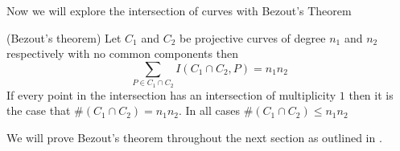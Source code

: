 Now we will explore the intersection of curves with Bezout's Theorem
\begin{thm} (Bezout's theorem)
Let $C_1$ and $C_2$ be projective curves of degree $n_1$ and $n_2$ respectively with no common components then 
$$\sum_{P\in C_1\cap C_2} I(C_1\cap C_2, P)=n_1n_2$$
If every point in the intersection has an intersection of multiplicity $1$ then it is the case that $\#(C_1\cap C_2)=n_1n_2$. In all cases $\#(C_1\cap C_2)\leq n_1n_2$
\end{thm}

We will prove Bezout's theorem throughout the next section as outlined in \cite{silverman_rational_2015}.


